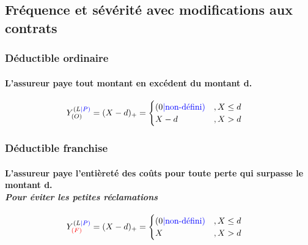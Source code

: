 \documentclass[10pt, french]{article}
\begin{document}
\begin{multicols*}{3}
\setcounter{section}{7}
\columnbreak
\section{Fréquence et sévérité avec modifications aux contrats}

\subsubsection*{Déductible ordinaire}

\paragraph{L'assureur paye tout montant en excédent du montant d.}
\begin{align*}
Y^{(L\textcolor{blue}{|P)}}_{(O)} &= (X-d)_+ = 
	\begin{cases}
		(0 {\color{blue}{| \text{non-défini})}}		& , X \leq d \\
		X - d	& , X > d \\
	\end{cases} 
\end{align*}

\subsubsection*{Déductible franchise}
\paragraph{L'assureur paye l'entièreté des coûts pour toute perte qui surpasse le montant d.\\ \textit{Pour éviter les petites réclamations}}
\begin{align*}
Y^{(L\textcolor{blue}{|P)}}_{\color{red}{(F)}} &= (X-d)_+ = 
	\begin{cases}
		(0 {\color{blue}{| \text{non-défini})}}		& , X \leq d \\
		X		& , X > d \\
	\end{cases} 
\end{align*}


\end{multicols*}
\end{document}
